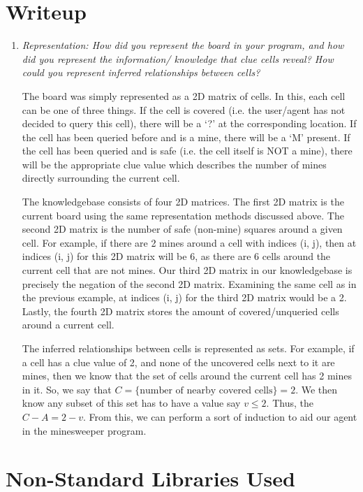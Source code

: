 \documentclass[12pt, twoside]{article}
\begin{document}
\section{Writeup}
\begin{enumerate}[itemsep=2mm,parsep=4mm]
    \item 
        \textit{Representation: How did you represent the board in your program, and how did you represent the information/ knowledge that clue cells reveal? How could you represent inferred relationships between cells?}
    
        The board was simply represented as a 2D matrix of cells. In this, each cell can be one of three things. If the cell is covered (i.e. the user/agent has not decided to query this cell), there will be a `?' at the corresponding location. If the cell has been queried before and is a mine, there will be a `M' present. If the cell has been queried and is safe (i.e. the cell itself is NOT a mine), there will be the appropriate clue value which describes the number of mines directly surrounding the current cell. 

        The knowledgebase consists of four 2D matrices. The first 2D matrix is the current board using the same representation methods discussed above. The second 2D matrix is the number of safe (non-mine) squares around a given cell. For example, if there are 2 mines around a cell with indices (i, j), then at indices (i, j) for this 2D matrix will be 6, as there are 6 cells around the current cell that are not mines. Our third 2D matrix in our knowledgebase is precisely the negation of the second 2D matrix. Examining the same cell as in the previous example, at indices (i, j) for the third 2D matrix would be a 2. Lastly, the fourth 2D matrix stores the amount of covered/unqueried cells around a current cell.

        The inferred relationships between cells is represented as sets. For example, if a cell has a clue value of 2, and none of the uncovered cells next to it are mines, then we know that the set of cells around the current cell has 2 mines in it. So, we say that $C = \{\text{number of nearby covered cells}\} = 2$. We then know any subset of this set has to have a value say $v \leq 2$. Thus, the $C - A = 2 - v$. From this, we can perform a sort of induction to aid our agent in the minesweeper program.

\end{enumerate}
 
\vfill
\pagebreak
\section{Non-Standard Libraries Used}
\end{document}
